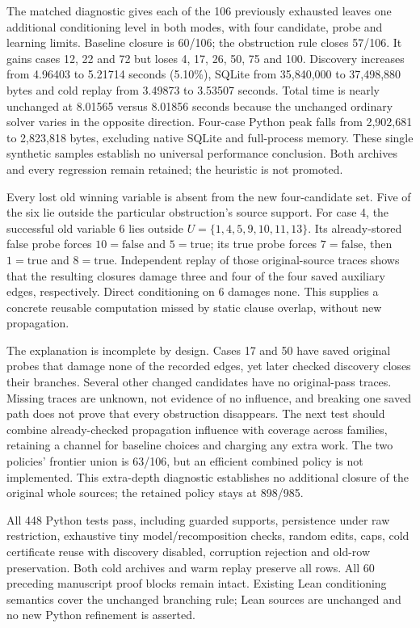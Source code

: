 \documentclass[11pt,a4paper]{article}
\numberwithin{equation}{section}
\theoremstyle{plain}
\theoremstyle{definition}
\theoremstyle{remark}
\begin{document}
The matched diagnostic gives each of the 106 previously exhausted leaves one additional conditioning level in both modes, with four candidate, probe and learning limits. Baseline closure is 60/106; the obstruction rule closes 57/106. It gains cases 12, 22 and 72 but loses 4, 17, 26, 50, 75 and 100. Discovery increases from 4.96403 to 5.21714 seconds (5.10\%), SQLite from 35,840,000 to 37,498,880 bytes and cold replay from 3.49873 to 3.53507 seconds. Total time is nearly unchanged at 8.01565 versus 8.01856 seconds because the unchanged ordinary solver varies in the opposite direction. Four-case Python peak falls from 2,902,681 to 2,823,818 bytes, excluding native SQLite and full-process memory. These single synthetic samples establish no universal performance conclusion. Both archives and every regression remain retained; the heuristic is not promoted.

Every lost old winning variable is absent from the new four-candidate set. Five of the six lie outside the particular obstruction's source support. For case 4, the successful old variable 6 lies outside $U=\{1,4,5,9,10,11,13\}$. Its already-stored false probe forces $10=\mathrm{false}$ and $5=\mathrm{true}$; its true probe forces $7=\mathrm{false}$, then $1=\mathrm{true}$ and $8=\mathrm{true}$. Independent replay of those original-source traces shows that the resulting closures damage three and four of the four saved auxiliary edges, respectively. Direct conditioning on 6 damages none. This supplies a concrete reusable computation missed by static clause overlap, without new propagation.

The explanation is incomplete by design. Cases 17 and 50 have saved original probes that damage none of the recorded edges, yet later checked discovery closes their branches. Several other changed candidates have no original-pass traces. Missing traces are unknown, not evidence of no influence, and breaking one saved path does not prove that every obstruction disappears. The next test should combine already-checked propagation influence with coverage across families, retaining a channel for baseline choices and charging any extra work. The two policies' frontier union is 63/106, but an efficient combined policy is not implemented. This extra-depth diagnostic establishes no additional closure of the original whole sources; the retained policy stays at 898/985.

All 448 Python tests pass, including guarded supports, persistence under raw restriction, exhaustive tiny model/recomposition checks, random edits, caps, cold certificate reuse with discovery disabled, corruption rejection and old-row preservation. Both cold archives and warm replay preserve all rows. All 60 preceding manuscript proof blocks remain intact. Existing Lean conditioning semantics cover the unchanged branching rule; Lean sources are unchanged and no new Python refinement is asserted.
\end{document}

